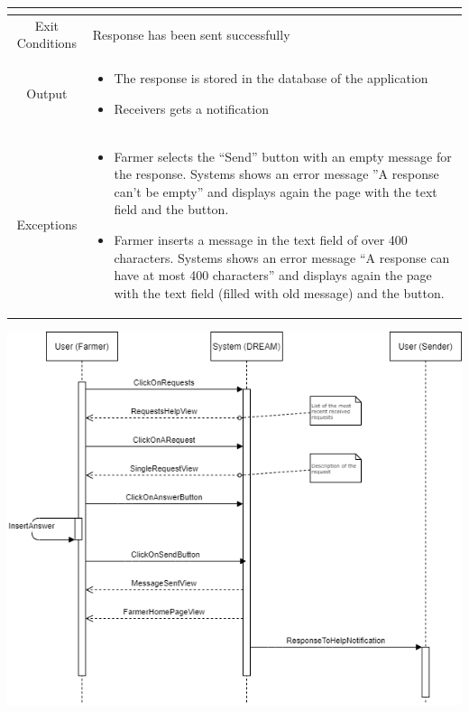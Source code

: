 \documentclass{article}
\begin{document}
\begin{center}
\begin{longtable}{|c| p{10cm}|}
\begin{itemize}
                            \end{itemize} \\
        \hline
            Exit Conditions & Response has been sent successfully\\
        \hline
            Output &    \begin{itemize}
                            \item The response is stored in the database of the application
                            \item Receivers gets a notification
                        \end{itemize}\\
        \hline
            Exceptions &    \begin{itemize}
                                \item Farmer selects the “Send” button with an empty message for the response. Systems shows an error message ”A response can’t be empty” and displays again the page with the text field and the button.
                                \item Farmer inserts a message in the text field of over 400 characters. Systems shows an error message “A response can have at most 400 characters” and displays again the page with the text field (filled with old message) and the button.
                            \end{itemize} \\
        \hline
    \end{longtable}
    
    \newpage

    \includegraphics[width=1.0\textwidth]{images/sequenceDiagrams/7. FarmerRespondHelp.png}
    \par
    \caption{\label{fig:frog}Farmer responds to a “Request for Help and Suggestions”}
    

\end{center}
\end{document}
